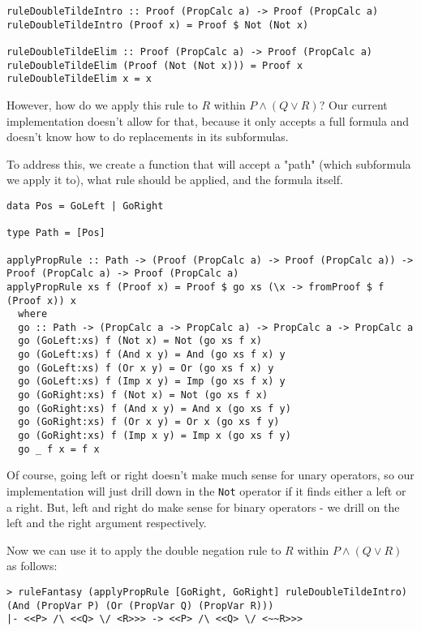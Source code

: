 \documentclass{article}
\begin{document}
\begin{lstlisting}
ruleDoubleTildeIntro :: Proof (PropCalc a) -> Proof (PropCalc a)
ruleDoubleTildeIntro (Proof x) = Proof $ Not (Not x)

ruleDoubleTildeElim :: Proof (PropCalc a) -> Proof (PropCalc a)
ruleDoubleTildeElim (Proof (Not (Not x))) = Proof x
ruleDoubleTildeElim x = x
\end{lstlisting}

However, how do we apply this rule to $R$ within $P \land (Q \lor R)$? Our current implementation doesn't allow for that, because it only accepts a full formula and doesn't know how to do replacements in its subformulas.

To address this, we create a function that will accept a "path" (which subformula we apply it to), what rule should be applied, and the formula itself.

\begin{lstlisting}
data Pos = GoLeft | GoRight

type Path = [Pos]

applyPropRule :: Path -> (Proof (PropCalc a) -> Proof (PropCalc a)) -> Proof (PropCalc a) -> Proof (PropCalc a)
applyPropRule xs f (Proof x) = Proof $ go xs (\x -> fromProof $ f (Proof x)) x
  where
  go :: Path -> (PropCalc a -> PropCalc a) -> PropCalc a -> PropCalc a
  go (GoLeft:xs) f (Not x) = Not (go xs f x)
  go (GoLeft:xs) f (And x y) = And (go xs f x) y
  go (GoLeft:xs) f (Or x y) = Or (go xs f x) y
  go (GoLeft:xs) f (Imp x y) = Imp (go xs f x) y
  go (GoRight:xs) f (Not x) = Not (go xs f x)
  go (GoRight:xs) f (And x y) = And x (go xs f y)
  go (GoRight:xs) f (Or x y) = Or x (go xs f y)
  go (GoRight:xs) f (Imp x y) = Imp x (go xs f y)
  go _ f x = f x
\end{lstlisting}

Of course, going left or right doesn't make much sense for unary operators, so our implementation will just drill down in the \texttt{Not} operator if it finds either a left or a right. But, left and right do make sense for binary operators - we drill on the left and the right argument respectively.

Now we can use it to apply the double negation rule to $R$ within $P \land (Q \lor R)$ as follows:

\begin{lstlisting}
> ruleFantasy (applyPropRule [GoRight, GoRight] ruleDoubleTildeIntro) (And (PropVar P) (Or (PropVar Q) (PropVar R)))
|- <<P> /\ <<Q> \/ <R>>> -> <<P> /\ <<Q> \/ <~~R>>>
\end{lstlisting}
\end{document}
